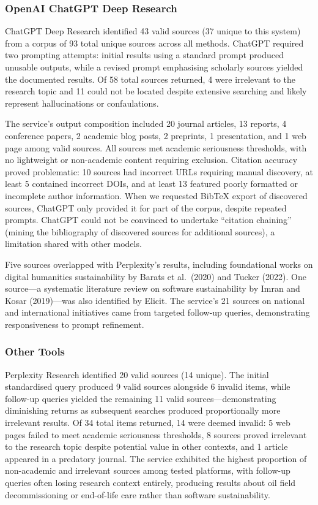 \subsubsection{OpenAI ChatGPT Deep Research}

ChatGPT Deep Research identified 43 valid sources (37 unique to this system) from a corpus of 93 total unique sources across all methods. ChatGPT required two prompting attempts: initial results using a standard prompt produced unusable outputs, while a revised prompt emphasising scholarly sources yielded the documented results. Of 58 total sources returned, 4 were irrelevant to the research topic and 11 could not be located despite extensive searching and likely represent hallucinations or confaulations.

The service's output composition included 20 journal articles, 13 reports, 4 conference papers, 2 academic blog posts, 2 preprints, 1 presentation, and 1 web page among valid sources. All sources met academic seriousness thresholds, with no lightweight or non-academic content requiring exclusion. Citation accuracy proved problematic: 10 sources had incorrect URLs requiring manual discovery, at least 5 contained incorrect DOIs, and at least 13 featured poorly formatted or incomplete author information. When we requested BibTeX export of discovered sources, ChatGPT only provided it for part of the corpus, despite repeated prompts. ChatGPT could not be convinced to undertake ``citation chaining'' (mining the bibliography of discovered sources for additional sources), a limitation shared with other models.

Five sources overlapped with Perplexity's results, including foundational works on digital humanities sustainability by Barats et al.\ (2020) and Tucker (2022). One source---a systematic literature review on software sustainability by Imran and Kosar (2019)---was also identified by Elicit. The service's 21 sources on national and international initiatives came from targeted follow-up queries, demonstrating responsiveness to prompt refinement.

\subsubsection{Other Tools}

Perplexity Research identified 20 valid sources (14 unique). The initial standardised query produced 9 valid sources alongside 6 invalid items, while follow-up queries yielded the remaining 11 valid sources---demonstrating diminishing returns as subsequent searches produced proportionally more irrelevant results. Of 34 total items returned, 14 were deemed invalid: 5 web pages failed to meet academic seriousness thresholds, 8 sources proved irrelevant to the research topic despite potential value in other contexts, and 1 article appeared in a predatory journal. The service exhibited the highest proportion of non-academic and irrelevant sources among tested platforms, with follow-up queries often losing research context entirely, producing results about oil field decommissioning or end-of-life care rather than software sustainability.

